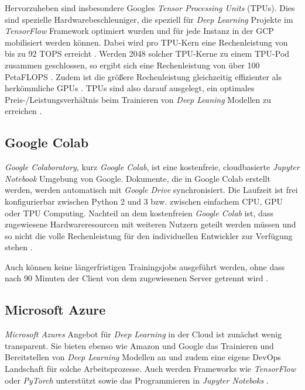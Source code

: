 Hervorzuheben sind insbesondere Googles \textit{Tensor Processing Units} (TPUs). Dies sind spezielle Hardwarebeschleuniger, die speziell für \textit{Deep Learning} Projekte im \textit{TensorFlow} Framework optimiert wurden und für jede Instanz in der GCP mobilisiert werden können. Dabei wird pro TPU-Kern eine Rechenleistung von bis zu 92 TOPS erreicht \cite{NormanP.JouppiCliffYoungNishantPatilDavidPatterson.2017}. Werden 2048 solcher TPU-Kerne zu einem TPU-Pod zusammen geschlossen, so ergibt sich eine Rechenleistung von über 100 PetaFLOPS \cite{GoogleCloud.20200209}. Zudem ist die größere Rechenleistung gleichzeitig effizienter als herkömmliche GPUs \cite{GoogleCloud.20200209b}. TPUs sind also darauf ausgelegt, ein optimales Preis-/Leistungsverhältnis beim Trainieren von \textit{Deep Leaning} Modellen zu erreichen \cite{GoogleCloudPlatform.20200314}.

\subsection*{Google Colab}

\textit{Google Colaboratory}, kurz \textit{Google Colab}, ist eine kostenfreie, cloudbasierte \textit{Jupyter Notebook} Umgebung von Google. Dokumente, die in Google Colab erstellt werden, werden automatisch mit \textit{Google Drive} synchronisiert. Die Laufzeit ist frei konfigurierbar zwischen Python 2 und 3 bzw. zwischen einfachem CPU, GPU oder TPU Computing. Nachteil an dem kostenfreien \textit{Google Colab} ist, dass zugewiesene Hardwareresourcen mit weiteren Nutzern geteilt werden müssen und so nicht die volle Rechenleistung für den individuellen Entwickler zur Verfügung stehen \cite{GoogleColaboratory.20200314}. 

Auch können keine längerfristigen Trainingsjobs ausgeführt werden, ohne dass nach 90 Minuten der Client von dem zugewiesenen Server getrennt wird \cite{GoogleCloud.20200314}.

\subsection*{Microsoft Azure}

\textit{Microsoft Azures} Angebot für \textit{Deep Learning} in der Cloud ist zunächst wenig transparent. Sie bieten ebenso wie Amazon und Google das Trainieren und Bereitstellen von \textit{Deep Learning} Modellen an und zudem eine eigene DevOps Landschaft für solche Arbeitsprozesse. Auch werden Frameworks wie \textit{TensorFlow} oder \textit{PyTorch} unterstützt sowie das Programmieren in \textit{Jupyter Noteboks} \cite{MicrosoftAzure.20200314}.

